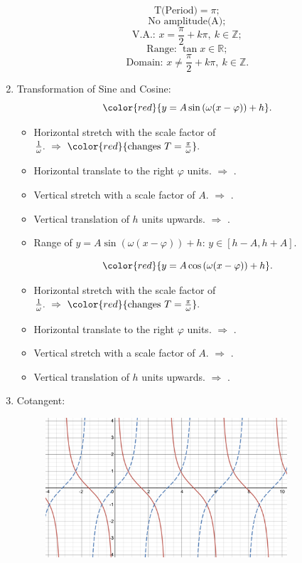 \documentclass[12pt, a4paper]{article}
\def\Z{{\mathbb{Z}}}
\def\R{{\mathbb{R}}}
\begin{document}
\begin{enumerate}
\begin{figure}[H]
  \end{figure}
  $$\text{T(Period)}=\pi;$$
  $$\text{No amplitude(A)};$$
  $$\text{V.A.: }x=\frac{\pi}{2}+k\pi,\ k\in\Z;$$
  $$\text{Range: }\tan{x}\in\R;$$
  $$\text{Domain: }x\neq\frac{\pi}{2}+k\pi,\ k\in\Z.$$
  \item Transformation of Sine and Cosine: 
  $${\color{red}{y=A\sin{\left(\omega(x-\varphi)\right)}+h}}.$$
  \begin{itemize}
      \item Horizontal stretch with the scale factor of $\frac{1}{\omega}.\ \Rightarrow\ {\color{red}{\text{changes }T=\frac{\pi}{\omega}}}.$
      \item Horizontal translate to the right $\varphi$ units. $\Rightarrow$ {\color{red}{changes the initial point to $(\varphi, 0)$}}.
      \item Vertical stretch with a scale factor of $A$. $\Rightarrow$ {\color{red}{changes the amplitude$=|A|$}}. 
      \item Vertical translation of $h$ units upwards. $\Rightarrow$ {\color{red}{changes the equilibrium position $y=h$}}.
      \item Range of $y=A\sin{\left(\omega(x-\varphi)\right)}+h$: $y\in\left[h-A, h+A\right]$.
  \end{itemize}
  $${\color{red}{y=A\cos\left(\omega(x-\varphi)\right)+h}}.$$
  \begin{itemize}
    \item Horizontal stretch with the scale factor of $\frac{1}{\omega}.\ \Rightarrow\ {\color{red}{\text{changes }T=\frac{\pi}{\omega}}}.$
    \item Horizontal translate to the right $\varphi$ units. $\Rightarrow$ {\color{red}{changes the initial point to $(\varphi, 1)$}}.
    \item Vertical stretch with a scale factor of $A$. $\Rightarrow$ {\color{red}{changes the amplitude$=|A|$, initial point $(\varphi, A)$}}. 
    \item Vertical translation of $h$ units upwards. $\Rightarrow$ {\color{red}{changes the equilibrium position $y=h$, initial point $(\varphi, A+h)$}}.
  \end{itemize}
  \item Cotangent: 
  \begin{figure}[H]
    \centering
    \includegraphics[width=0.85\textwidth]{Fig.3.28.jpg}

\end{figure}
\end{enumerate}
\end{document}
